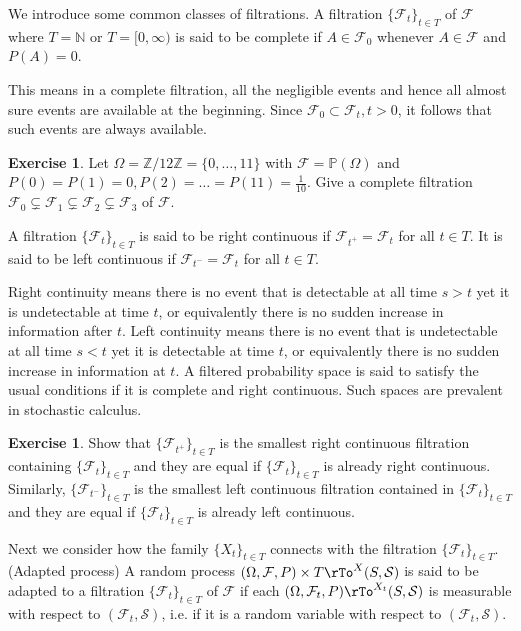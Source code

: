 \documentclass[12pt]{amsart}
\theoremstyle{definition}
\newtheorem{exercise}[theorem]{Exercise}
\begin{document}
We introduce some common classes of filtrations.
\dfn A filtration $\{\mathcal{F}_t\}_{t \in T}$ of $\mathcal{F}$ where $T = \mathbb{N}$ or $T = [0,\infty)$ is said to be complete if $A \in \mathcal{F}_0$ whenever $A \in \mathcal{F}$ and $P(A) = 0$.

This means in a complete filtration, all the negligible  events and hence all almost sure events are available at the beginning. Since $\mathcal{F}_0 \subset \mathcal{F}_t, t > 0$, it follows that  such events
 are always available.

\begin{exercise} Let $\Omega = \mathbb{Z}/12\mathbb{Z} = \{0, \dots , 11\}$ with $\mathcal{F} = \mathbb{P}(\Omega)$ and $P(0) = P(1) = 0, P(2) = \dots = P(11) = \frac{1}{10}$. Give a complete filtration $\mathcal{F}_0 \subsetneq \mathcal{F}_1 \subsetneq \mathcal{F}_2 \subsetneq \mathcal{F}_3$ of $\mathcal{F}$.
\end{exercise}

\dfn A filtration $\{\mathcal{F}_t\}_{t \in T}$ is said to be right continuous if $\mathcal{F}_{t^+} = \mathcal{F}_t$ for all $t \in T$. It is said to be left continuous if $\mathcal{F}_{t^-} = \mathcal{F}_t$ for all $t \in T$.

Right continuity means there is no event that is detectable at all time $s > t$ yet it is undetectable at time $t$, or equivalently there is no sudden increase in information after $t$. Left continuity means there is no event that is undetectable at all time $s < t$ yet it is detectable at time $t$, or equivalently there is no sudden increase in information at $t$. A filtered probability space is said to satisfy the usual conditions if it is complete and right continuous. Such spaces are prevalent in stochastic calculus.

\begin{exercise} Show that $\{\mathcal{F}_{t^+}\}_{t \in T}$ is the smallest right continuous filtration containing $\{\mathcal{F}_t\}_{t \in T}$ and they are equal if $\{\mathcal{F}_t\}_{t \in T}$ is already right continuous. Similarly, $\{\mathcal{F}_{t^-}\}_{t \in T}$ is the smallest left continuous filtration contained in $\{\mathcal{F}_t\}_{t \in T}$ and they are equal if $\{\mathcal{F}_t\}_{t \in T}$ is already left continuous.
\end{exercise}

Next we consider how the family $\{X_t\}_{t \in T}$ connects with the filtration $\{\mathcal{F}_t\}_{t \in T}$.
\dfn (Adapted process) A random process $(\Omega, \mathcal{F}, P) \times T \rTo^X (S, \mathcal{S})$ is said to be adapted to a filtration $\{ \mathcal{F}_t \}_{t \in T}$ of $\mathcal{F}$ if each $(\Omega, \mathcal{F}_t, P) \rTo^{X_t} (S, \mathcal{S})$ is measurable with respect to $(\mathcal{F}_t, \mathcal{S})$, i.e. if it is a random variable with respect to $(\mathcal{F}_t, \mathcal{S})$.
\end{document}
